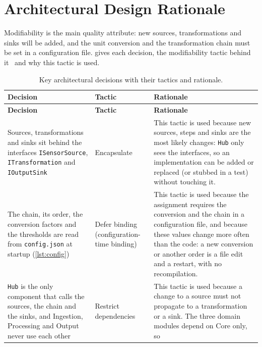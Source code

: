 \documentclass[../main-en.tex]{subfiles}
\begin{document}
\section{Architectural Design Rationale}
\label{sec:rationale}

Modifiability is the main quality attribute: new sources, transformations
and sinks will be added, and the unit conversion and the transformation chain
must be set in a configuration file.  gives each
decision, the modifiability tactic behind it~\cite{bass_software_2021} and
why this tactic is used.

\begingroup
\small
\begin{xltabular}{\textwidth}{| >{\raggedright\arraybackslash{}\hsize}X
                               | >{\raggedright\arraybackslash{}\hsize}X
                               | >{\raggedright\arraybackslash{}\hsize}X |}
  \caption{Key architectural decisions with their tactics and rationale.}
  \label{tab:rationale}\\
  \hline
  \textbf{Decision} & \textbf{Tactic} & \textbf{Rationale} \\
  \hline
  \endfirsthead
  \hline
  \textbf{Decision} & \textbf{Tactic} & \textbf{Rationale} \\
  \hline
  \endhead
  \hline
  \endfoot
  \hline
  \endlastfoot
  Sources, transformations and sinks sit behind the interfaces
  \texttt{ISensorSource}, \texttt{ITransformation} and \texttt{IOutputSink}
  & Encapsulate &
  This tactic is used because new sources, steps and sinks are the most
  likely changes: \texttt{Hub} only sees the interfaces, so an implementation
  can be added or replaced (or stubbed in a test) without touching it. \\
  \hline
  The chain, its order, the conversion factors and the thresholds are read
  from \texttt{config.json} at startup (\cref{lst:config})
  & Defer binding (configuration-time binding) &
  This tactic is used because the assignment requires the conversion and the
  chain in a configuration file, and because these values change more often
  than the code: a new conversion or another order is a file edit and a
  restart, with no recompilation. \\
  \hline
  \texttt{Hub} is the only component that calls the sources, the chain and
  the sinks, and Ingestion, Processing and Output never use each other
  & Restrict dependencies &
  This tactic is used because a change to a source must not propagate to a
  transformation or a sink. The three domain modules depend on Core only, so

\end{xltabular}
\end{document}
